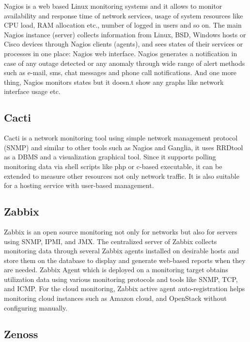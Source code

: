 \documentclass{sig-alternate}
\begin{document}
Nagios is a web based Linux monitoring systems and it allows to monitor availability and response time of network services, usage of system resources like CPU load, RAM allocation etc., number of logged in users and so on. The main Nagios instance (server) collects information from Linux, BSD, Windows hosts or Cisco devices through Nagios clients (agents), and sees states of their services or processes in one place: Nagios web interface. Nagios generates a notification in case of any outage detected or any anomaly through wide range of alert methods such as e-mail, sms, chat messages and phone call notifications. And one more thing, Nagios monitors states but it doesn.t show any graphs like network interface usage etc.

\subsection{Cacti}
Cacti is a network monitoring tool using simple network management protocol (SNMP) and similar to other tools such as Nagios and Ganglia, it uses RRDtool as a DBMS and a visualization graphical tool. Since it supports polling monitoring data via shell scripts like php or c-based executable, it can be extended to measure other resources not only network traffic. It is also suitable for a hosting service with user-based management.

\subsection{Zabbix}

Zabbix is an open source monitoring not only for networks but also for servers using SNMP, IPMI, and JMX. The centralized server of Zabbix collects monitoring data through several Zabbix agents installed on desirable hosts and store them on the database to display and generate web-based reports when they are needed. Zabbix Agent which is deployed on a monitoring target obtains utilization data using various monitoring protocols and tools like SNMP, TCP, and ICMP. For the cloud monitoring, Zabbix active agent auto-registration helps monitoring cloud instances such as Amazon cloud, and OpenStack without configuring manually.

\subsection{Zenoss}
\end{document}
